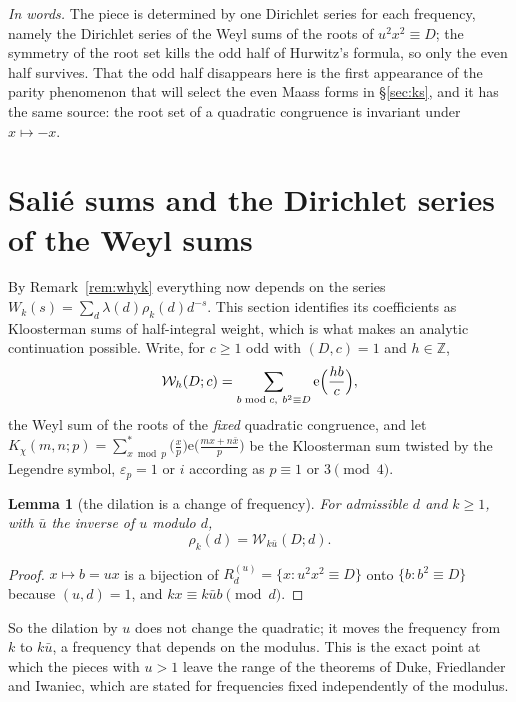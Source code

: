 \documentclass[11pt,a4paper]{article}
\newtheorem{lemma}[theorem]{Lemma}
\theoremstyle{remark}\newtheorem{remark}[theorem]{Remark}
\newcommand{\Z}{\mathbb Z}\newcommand{\R}{\mathbb R}\newcommand{\Q}{\mathbb Q}\newcommand{\C}{\mathbb C}
\newcommand{\e}{\mathrm e}\newcommand{\Off}{\mathrm{Off}}\newcommand{\rep}[2]{\langle #1\rangle_{#2}}
\begin{document}
\emph{In words.} The piece is determined by one Dirichlet series for each frequency, namely the Dirichlet series of
the Weyl sums of the roots of $u^2x^2\equiv D$; the symmetry of the root set kills the odd half of Hurwitz's formula,
so only the even half survives. That the odd half disappears here is the first appearance of the parity phenomenon
that will select the even Maass forms in \S\ref{sec:ks}, and it has the same source: the root set of a quadratic
congruence is invariant under $x\mapsto-x$.

\section{Sali\'e sums and the Dirichlet series of the Weyl sums}\label{sec:salie}

By Remark~\ref{rem:whyk} everything now depends on the series $W_k(s)=\sum_d\lambda(d)\rho_k(d)d^{-s}$. This section
identifies its coefficients as Kloosterman sums of half-integral weight, which is what makes an analytic continuation
possible. Write, for $c\ge1$ odd with $(D,c)=1$ and $h\in\Z$,
\begin{equation}\label{eq:Wh}
\mathcal W_h(D;c)=\sum_{b\bmod c,\ b^2\equiv D}\e\Bigl(\frac{hb}c\Bigr),
\end{equation}
the Weyl sum of the roots of the \emph{fixed} quadratic congruence, and let
$K_\chi(m,n;p)=\sum_{x\bmod p}^{*}\bigl(\tfrac xp\bigr)\e\bigl(\tfrac{mx+n\bar x}p\bigr)$ be the Kloosterman sum
twisted by the Legendre symbol, $\varepsilon_p=1$ or $i$ according as $p\equiv1$ or $3\pmod4$.

\begin{lemma}[the dilation is a change of frequency]\label{lem:bridge}
For admissible $d$ and $k\ge1$, with $\bar u$ the inverse of $u$ modulo $d$,
\[
\rho_k(d)=\mathcal W_{k\bar u}(D;d).
\]
\end{lemma}
\begin{proof}
$x\mapsto b=ux$ is a bijection of $R^{(u)}_d=\{x:u^2x^2\equiv D\}$ onto $\{b:b^2\equiv D\}$ because $(u,d)=1$, and
$kx\equiv k\bar ub\pmod d$.
\end{proof}

So the dilation by $u$ does not change the quadratic; it moves the frequency from $k$ to $k\bar u$, a frequency that
depends on the modulus. This is the exact point at which the pieces with $u>1$ leave the range of the theorems of
Duke, Friedlander and Iwaniec, which are stated for frequencies fixed independently of the modulus.
\end{document}
